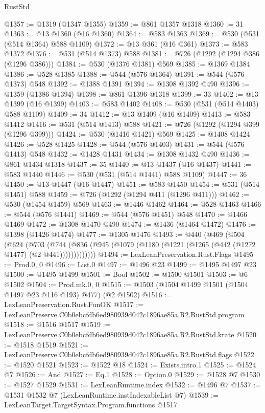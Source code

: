 \begin{lexlean}{RustStd}
\begin{coremodule}
@1357 := @1319 (@1347 @1355)
@1359 := @861 @1357 @1318
@1360 := 31
@1363 := @13 @1360 (@16 @1360)
@1364 := @583 @1363
@1369 := @530 (@531 (@514 @1364) @588 @1109)
@1372 := @13 @361 (@16 @361)
@1373 := @583 @1372
@1376 := @531 (@514 @1373) @588
@1381 := @726 (@1292 (@1294 @386 (@1296 @386)))
@1384 := @530 (@1376 @1381) @569
@1385 := @1369 @1384
@1386 := @528 @1385
@1388 := @544 (@576 @1364)
@1391 := @544 (@576 @1373) @548
@1392 := @1388 @1391
@1394 := @1308 @1392 @490
@1396 := @1359 (@1386 @1394)
@1398 := @861 @1396 @1318
@1399 := 33
@1402 := @13 @1399 (@16 @1399)
@1403 := @583 @1402
@1408 := @530 (@531 (@514 @1403) @588 @1109)
@1409 := 34
@1412 := @13 @1409 (@16 @1409)
@1413 := @583 @1412
@1416 := @531 (@514 @1413) @588
@1421 := @726 (@1292 (@1294 @399 (@1296 @399)))
@1424 := @530 (@1416 @1421) @569
@1425 := @1408 @1424
@1426 := @528 @1425
@1428 := @544 (@576 @1403)
@1431 := @544 (@576 @1413) @548
@1432 := @1428 @1431
@1434 := @1308 @1432 @490
@1436 := @861 @1434 @1318
@1437 := 35
@1440 := @13 @1437 (@16 @1437)
@1441 := @583 @1440
@1446 := @530 (@531 (@514 @1441) @588 @1109)
@1447 := 36
@1450 := @13 @1447 (@16 @1447)
@1451 := @583 @1450
@1454 := @531 (@514 @1451) @588
@1459 := @726 (@1292 (@1294 @411 (@1296 @411)))
@1462 := @530 (@1454 @1459) @569
@1463 := @1446 @1462
@1464 := @528 @1463
@1466 := @544 (@576 @1441)
@1469 := @544 (@576 @1451) @548
@1470 := @1466 @1469
@1472 := @1308 @1470 @490
@1474 := @1436 (@1464 @1472)
@1476 := @1398 (@1426 @1474)
@1477 := @1305 @1476
@1493 := @440
    (@469
      (@504
        (@624
          (@703
            (@744 (@836 (@945 (@1079 (@1180 (@1221 (@1265 (@442 (@1272 @1477) (@2 @441)))))))))))))
@1494 := LexLeanPreservation.Rust.Flags
@1495 := Prod.{0, 0}
@1496 := List.{0}
@1497 := @1496 @23
@1499 := @1495 @1497 @23
@1500 := @1495 @1499
@1501 := Bool
@1502 := @1500 @1501
@1503 := @6 @1502
@1504 := Prod.mk.{0, 0}
@1515 := @1503 (@1504 @1499 @1501 (@1504 @1497 @23 @116 @193) @477) (@2 @1502)
@1516 := LexLeanPreservation.Rust.FunOK
@1517 := LexLeanPreserve.C0b0ebcfdb6ed980939d042c1896ae85a.R2.RustStd.program
@1518 := @1516 @1517
@1519 := LexLeanPreserve.C0b0ebcfdb6ed980939d042c1896ae85a.R2.RustStd.krate
@1520 := @1518 @1519
@1521 := LexLeanPreserve.C0b0ebcfdb6ed980939d042c1896ae85a.R2.RustStd.flags
@1522 := @1520 @1521
@1523 := @1522 @18
@1524 := Exists.intro.{1}
@1525 := @1524 @7
@1526 := And
@1527 := Eq.{1}
@1528 := Option.{0}
@1529 := @1528 @7
@1530 := @1527 @1529
@1531 := LexLeanRuntime.index
@1532 := @1496 @7
@1537 := @1531 @1532 @7 (LexLeanRuntime.instIndexableList @7)
@1539 := LexLeanTarget.TargetSyntax.Program.functions @1517

\end{coremodule}
\end{lexlean}
